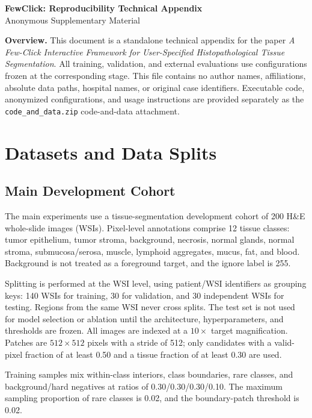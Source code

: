 \documentclass[11pt,letterpaper]{article}
\newcommand{\code}[1]{\texttt{#1}}
\begin{document}
\begin{center}
{\LARGE \textbf{FewClick: Reproducibility Technical Appendix}}\\[5pt]
{\large Anonymous Supplementary Material}
\end{center}

\noindent\textbf{Overview.} This document is a standalone technical appendix for the paper \emph{A Few-Click Interactive Framework for User-Specified Histopathological Tissue Segmentation}. All training, validation, and external evaluations use configurations frozen at the corresponding stage. This file contains no author names, affiliations, absolute data paths, hospital names, or original case identifiers. Executable code, anonymized configurations, and usage instructions are provided separately as the \code{code\_and\_data.zip} code-and-data attachment.

\section{Datasets and Data Splits}
\subsection{Main Development Cohort}
The main experiments use a tissue-segmentation development cohort of 200 H\&E whole-slide images (WSIs). Pixel-level annotations comprise 12 tissue classes: tumor epithelium, tumor stroma, background, necrosis, normal glands, normal stroma, submucosa/serosa, muscle, lymphoid aggregates, mucus, fat, and blood. Background is not treated as a foreground target, and the ignore label is 255.

Splitting is performed at the WSI level, using patient/WSI identifiers as grouping keys: 140 WSIs for training, 30 for validation, and 30 independent WSIs for testing. Regions from the same WSI never cross splits. The test set is not used for model selection or ablation until the architecture, hyperparameters, and thresholds are frozen. All images are indexed at a $10\times$ target magnification. Patches are $512\times512$ pixels with a stride of 512; only candidates with a valid-pixel fraction of at least 0.50 and a tissue fraction of at least 0.30 are used.

Training samples mix within-class interiors, class boundaries, rare classes, and background/hard negatives at ratios of 0.30/0.30/0.30/0.10. The maximum sampling proportion of rare classes is 0.02, and the boundary-patch threshold is 0.02.
\end{document}
